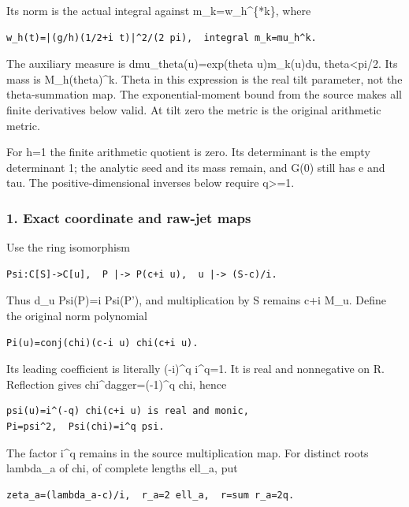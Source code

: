 Its norm is the actual integral against m\_k=w\_h\^{}\{*k\}, where

\begin{verbatim}
w_h(t)=|(g/h)(1/2+i t)|^2/(2 pi),  integral m_k=mu_h^k.
\end{verbatim}

The auxiliary measure is dmu\_theta(u)=exp(theta u)m\_k(u)du, \textbar theta\textbar\textless pi/2. Its mass is M\_h(theta)\^{}k. Theta in this expression is the real tilt parameter, not the theta-summation map. The exponential-moment bound from the source makes all finite derivatives below valid. At tilt zero the metric is the original arithmetic metric.

For h=1 the finite arithmetic quotient is zero. Its determinant is the empty determinant 1; the analytic seed and its mass remain, and G(0) still has e and tau. The positive-dimensional inverses below require q\textgreater=1.

\subsubsection{1. Exact coordinate and raw-jet maps}\label{endpoint-pr24_original--exact-coordinate-and-raw-jet-maps}

Use the ring isomorphism

\begin{verbatim}
Psi:C[S]->C[u],  P |-> P(c+i u),  u |-> (S-c)/i.
\end{verbatim}

Thus d\_u Psi(P)=i Psi(P'), and multiplication by S remains c+i M\_u. Define the original norm polynomial

\begin{verbatim}
Pi(u)=conj(chi)(c-i u) chi(c+i u).
\end{verbatim}

Its leading coefficient is literally (-i)\^{}q i\^{}q=1. It is real and nonnegative on R. Reflection gives chi\^{}dagger=(-1)\^{}q chi, hence

\begin{verbatim}
psi(u)=i^(-q) chi(c+i u) is real and monic,
Pi=psi^2,  Psi(chi)=i^q psi.
\end{verbatim}

The factor i\^{}q remains in the source multiplication map. For distinct roots lambda\_a of chi, of complete lengths ell\_a, put

\begin{verbatim}
zeta_a=(lambda_a-c)/i,  r_a=2 ell_a,  r=sum r_a=2q.
\end{verbatim}

